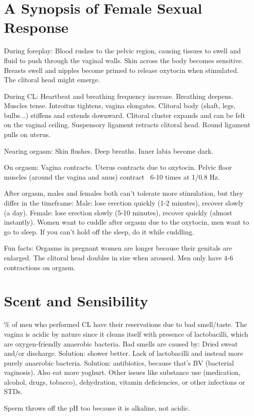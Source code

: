 \section{A Synopsis of Female Sexual Response}
\begin{outline}
\1 During foreplay:
	\2 Blood rushes to the pelvic region, causing tissues to swell and fluid to push through the vaginal walls.
	\2 Skin across the body becomes sensitive.
	\2 Breasts swell and nipples become primed to release oxytocin when stimulated.
	\2 The clitoral head might emerge.

\1 During CL:
	\2 Heartbeat and breathing frequency increase. Breathing deepens. Muscles tense.
	\2 Introitus tightens, vagina elongates.
	\2 Clitoral body (shaft, legs, bulbs...) stiffens and extends downward. Clitoral cluster expands and can be felt on the vaginal ceiling.
	\2 Suspensory ligament retracts clitoral head.
	\2 Round ligament pulls on uterus.

\1 Nearing orgasm:
	\2 Skin flushes.
	\2 Deep breaths.
	\2 Inner labia become dark.

\1 On orgasm:
	\2 Vagina contracts.
	\2 Uterus contracts due to oxytocin.
	\2 Pelvic floor muscles (around the vagina and anus) contract ~6-10 times at 1/0.8 Hz.

\1 After orgasm, males and females both can't tolerate more stimulation, but they differ in the timeframe:
	\2 Male: lose erection quickly (1-2 minutes), recover slowly (a day).
	\2 Female: lose erection slowly (5-10 minutes), recover quickly (almost instantly).
	\2 Women want to cuddle after orgasm due to the oxytocin, men want to go to sleep. If you can't hold off the sleep, do it while cuddling.

\1 Fun facts:
	\2 Orgasms in pregnant women are longer because their genitals are enlarged.
	\2 The clitoral head doubles in size when aroused.
	\2 Men only have 4-6 contractions on orgasm.
\end{outline}

\section{Scent and Sensibility}
\begin{outline}
\% of men who performed CL have their reservations due to bad smell/taste.
\1 The vagina is acidic by nature since it cleans itself with presence of lactobacilli, which are oxygen-friendly anaerobic bacteria.
\1 Bad smells are caused by:
	\2 Dried sweat and/or discharge. Solution: shower better.
	\2 Lack of lactobacilli and instead more purely anaerobic bacteria. Solution: antibiotics, because that's BV (bacterial vaginosis). Also eat more yoghurt.
	\2 Other issues like substance use (medication, alcohol, drugs, tobacco), dehydration, vitamin deficiencies, or other infections or STDs.
	
\1 Sperm throws off the pH too because it is alkaline, not acidic.
\end{outline}

